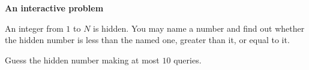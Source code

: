 \textbf{An interactive problem}

An integer from $1$ to $N$ is hidden. You may name a number and find out whether the hidden number is less than the named one, greater than it, or equal to it.

Guess the hidden number making at most $10$ queries.
